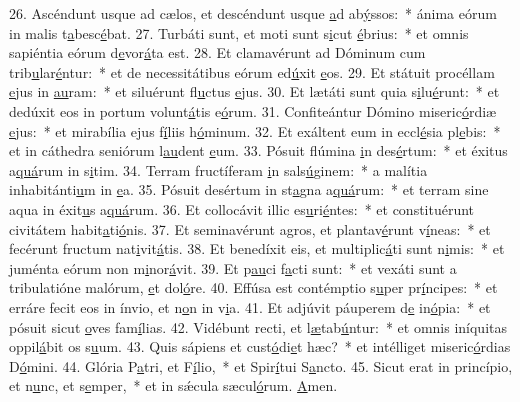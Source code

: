 26. Ascéndunt usque ad cælos, et descéndunt usque \uline{a}d ab\uline{ý}ssos:~* ánima eórum in malis t\uline{a}besc\uline{é}bat.
27. Turbáti sunt, et moti sunt s\uline{i}cut \uline{é}brius:~* et omnis sapiéntia eórum d\uline{e}vor\uline{á}ta est.
28. Et clamavérunt ad Dóminum cum trib\uline{u}lar\uline{é}ntur:~* et de necessitátibus eórum ed\uline{ú}xit \uline{e}os.
29. Et státuit procéllam \uline{e}jus in \uline{au}ram:~* et siluérunt fl\uline{u}ctus \uline{e}jus.
30. Et lætáti sunt quia s\uline{i}lu\uline{é}runt:~* et dedúxit eos in portum volunt\uline{á}tis e\uline{ó}rum.
31. Confiteántur Dómino miseric\uline{ó}rdiæ \uline{e}jus:~* et mirabília ejus f\uline{í}liis h\uline{ó}minum.
32. Et exáltent eum in eccl\uline{é}sia pl\uline{e}bis:~* et in cáthedra seniórum l\uline{au}dent \uline{e}um.
33. Pósuit flúmina \uline{i}n des\uline{é}rtum:~* et éxitus a\uline{quá}rum in s\uline{i}tim.
34. Terram fructíferam \uline{i}n sals\uline{ú}ginem:~* a malítia inhabitánti\uline{u}m in \uline{e}a.
35. Pósuit desértum in st\uline{a}gna a\uline{quá}rum:~* et terram sine aqua in éxit\uline{u}s a\uline{quá}rum.
36. Et collocávit illic es\uline{u}ri\uline{é}ntes:~* et constituérunt civitátem habit\uline{a}ti\uline{ó}nis.
37. Et seminavérunt agros, et plantav\uline{é}runt v\uline{í}neas:~* et fecérunt fructum nat\uline{i}vit\uline{á}tis.
38. Et benedíxit eis, et multiplic\uline{á}ti sunt n\uline{i}mis:~* et juménta eórum non m\uline{i}nor\uline{á}vit.
39. Et p\uline{au}ci f\uline{a}cti sunt:~* et vexáti sunt a tribulatióne malórum, \uline{e}t dol\uline{ó}re.
40. Effúsa est contémptio s\uline{u}per pr\uline{í}ncipes:~* et erráre fecit eos in ínvio, et n\uline{o}n in v\uline{i}a.
41. Et adjúvit páuperem d\uline{e} in\uline{ó}pia:~* et pósuit sicut \uline{o}ves fam\uline{í}lias.
42. Vidébunt recti, et l\uline{æ}tab\uline{ú}ntur:~* et omnis iníquitas oppil\uline{á}bit os s\uline{u}um.
43. Quis sápiens et cust\uline{ó}di\uline{e}t hæc?~* et intélliget miseric\uline{ó}rdias D\uline{ó}mini.
44. Glória P\uline{a}tri, et F\uline{í}lio,~* et Spir\uline{í}tui S\uline{a}ncto.
45. Sicut erat in princípio, et n\uline{u}nc, et s\uline{e}mper,~* et in sǽcula sæcul\uline{ó}rum. \uline{A}men.
